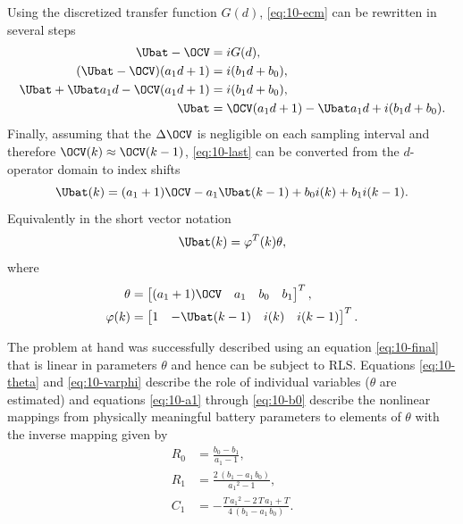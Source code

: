 Using the discretized transfer function $G(d)$, \eqref{eq:10-ecm} can be rewritten in several steps
\begin{align}
    \Ubat - \OCV &= i G(d), \\
    (\Ubat - \OCV)(a_1 d + 1) &=  i (b_1 d + b_0), \\
    \Ubat + \Ubat a_1 d - \OCV(a_1 d + 1) &=  i (b_1 d + b_0), \\
     \Ubat &= \OCV (a_1 d + 1) - \Ubat a_1 d + i (b_1 d + b_0).
     \label{eq:10-last}
\end{align}
Finally, assuming that the $\Delta \OCV$ is negligible on each sampling interval and therefore $\OCV(k) \approx \OCV(k-1)$, \eqref{eq:10-last} can be converted from the $d$-operator domain to index shifts
\begin{equation}
    \Ubat(k) = (a_1 + 1) \OCV - a_1 \Ubat(k-1) + b_0 i(k) + b_1 i(k-1).
    \label{eq:10-final}
\end{equation}
Equivalently in the short vector notation
\begin{equation}
    \Ubat(k) = \varphi^T(k) \theta,
\end{equation}
where
\begin{align}
    \theta &= \begin{bmatrix} (a_1 + 1) \OCV & a_1 & b_0 & b_1\end{bmatrix}^T, \label{eq:10-theta} \\ 
    \varphi(k) &= \begin{bmatrix} 1 & -\Ubat(k-1) & i(k) & i(k-1)\end{bmatrix}^T.
    \label{eq:10-varphi}
\end{align}

The problem at hand was successfully described using an equation \eqref{eq:10-final} that is linear in parameters $\theta$ and hence can be subject to RLS. Equations \eqref{eq:10-theta} and \eqref{eq:10-varphi} describe the role of individual variables ($\theta$ are estimated) and
equations \eqref{eq:10-a1} through \eqref{eq:10-b0} describe the nonlinear mappings from physically meaningful battery parameters to elements of $\theta$ with the inverse mapping given by
\begin{align}
R_0 &= \frac{b_0 -b_1 }{a_1 -1},\\
R_1 &= \frac{2\,{\left(b_1 -a_1 \,b_0 \right)}}{{a_1 }^2 -1}, \\
C_1 &= -\frac{T\,{a_1 }^2 -2\,T\,a_1 +T}{4\,{\left(b_1 -a_1 \,b_0 \right)}}.
\end{align}

